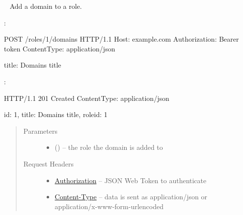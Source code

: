 \documentclass[letterpaper,10pt,english]{sphinxmanual}
\begin{document}
\begin{fulllineitems}
\label{\detokenize{resources/role:post--roles-(role_id)-domains}}~
Add a domain to a role.

:

\begin{sphinxVerbatim}[commandchars=\\\{\}]
POST /roles/1/domains HTTP/1.1
Host: example.com
Authorization: Bearer \PYGZlt{}token\PYGZgt{}
Content\PYGZhy{}Type: application/json

\PYGZob{}
    \PYGZsq{}title\PYGZsq{}: \PYGZsq{}Domain\PYGZsq{}s title\PYGZsq{}
\PYGZcb{}
\end{sphinxVerbatim}

:

\begin{sphinxVerbatim}[commandchars=\\\{\}]
HTTP/1.1 201 Created
Content\PYGZhy{}Type: application/json

\PYGZob{}
    \PYGZsq{}id\PYGZsq{}: 1,
    \PYGZsq{}title\PYGZsq{}: \PYGZsq{}Domain\PYGZsq{}s title\PYGZsq{},
    \PYGZsq{}role\PYGZus{}id\PYGZsq{}: 1
\PYGZcb{}
\end{sphinxVerbatim}
\begin{quote}\begin{description}
\item[{Parameters}] \leavevmode\begin{itemize}
\item {} 
 () -- the role the domain is added to

\end{itemize}

\item[{Request Headers}] \leavevmode\begin{itemize}
\item {} 
\href{http://tools.ietf.org/html/rfc7235\#section-4.2}{Authorization} -- JSON Web Token to authenticate

\item {} 
\href{http://tools.ietf.org/html/rfc7231\#section-3.1.1.5}{Content-Type} -- data is sent as application/json or
application/x-www-form-urlencoded

\end{itemize}


\end{description}
\end{quote}
\end{fulllineitems}
\end{document}
